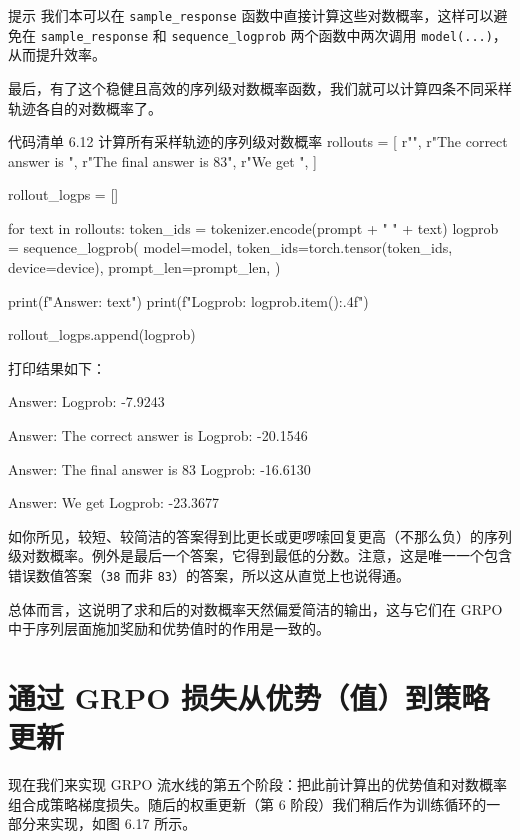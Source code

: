\begin{myWarning}{提示}
 我们本可以在 \texttt{sample\_response} 函数中直接计算这些对数概率，这样可以避免在 \texttt{sample\_response} 和 \texttt{sequence\_logprob} 两个函数中两次调用 \texttt{model(...)}，从而提升效率。\end{myWarning}

最后，有了这个稳健且高效的序列级对数概率函数，我们就可以计算四条不同采样轨迹各自的对数概率了。

\begin{codeboxt}{代码清单 6.12 计算所有采样轨迹的序列级对数概率}
rollouts = [
    r"",
    r"The correct answer is ",
    r"The final answer is 83",
    r"We get ",
]

rollout_logps = []

for text in rollouts:
    token_ids = tokenizer.encode(prompt + " " + text)
    logprob = sequence_logprob(
        model=model,
        token_ids=torch.tensor(token_ids, device=device),
        prompt_len=prompt_len,
    )

    print(f"Answer:  {text}")
    print(f"Logprob: {logprob.item():.4f}\n")

    rollout_logps.append(logprob)
\end{codeboxt}

打印结果如下：

\begin{codebox}
Answer:  
Logprob: -7.9243

Answer:  The correct answer is 
Logprob: -20.1546

Answer:  The final answer is 83
Logprob: -16.6130

Answer:  We get 
Logprob: -23.3677
\end{codebox}

如你所见，较短、较简洁的答案得到比更长或更啰嗦回复更高（不那么负）的序列级对数概率。例外是最后一个答案，它得到最低的分数。注意，这是唯一一个包含错误数值答案（\texttt{38} 而非 \texttt{83}）的答案，所以这从直觉上也说得通。

总体而言，这说明了求和后的对数概率天然偏爱简洁的输出，这与它们在 GRPO 中于序列层面施加奖励和优势值时的作用是一致的。

\section{通过 GRPO 损失从优势（值）到策略更新}

现在我们来实现 GRPO 流水线的第五个阶段：把此前计算出的优势值和对数概率组合成策略梯度损失。随后的权重更新（第 6 阶段）我们稍后作为训练循环的一部分来实现，如图 6.17 所示。

